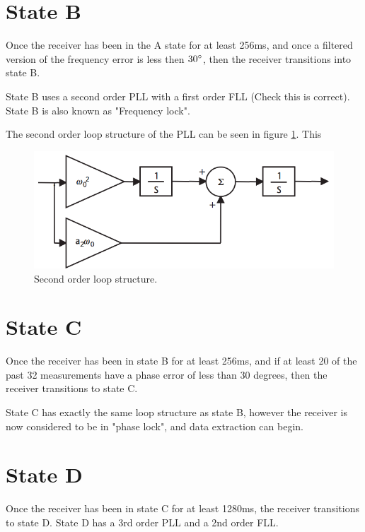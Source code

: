 \section{State B}
Once the receiver has been in the A state for at least 256ms, and once a filtered version of the frequency error is less then $30 \degree$, then the receiver transitions into state B.

State B uses a second order PLL with a first order FLL (Check this is correct). State B is also known as "Frequency lock".

The second order loop structure of the PLL can be seen in figure \ref{fig:SecondOrderLoopKaplan}. This 

\begin{figure}[!htb] 
    \centering
    \includegraphics[width=1\textwidth]{Images/LoopArchitectures/SecondOrderLoop.png}
    \caption{Second order loop structure.}
    \label{fig:SecondOrderLoopKaplan}
\end{figure}


\section{State C}
Once the receiver has been in state B for at least 256ms, and if at least 20 of the past 32 measurements have a phase error of less than 30 degrees, then the receiver transitions to state C.

State C has exactly the same loop structure as state B, however the receiver is now considered to be in "phase lock", and data extraction can begin.

\section{State D}

Once the receiver has been in state C for at least 1280ms, the receiver transitions to state D. State D has a 3rd order PLL and a 2nd order FLL.




